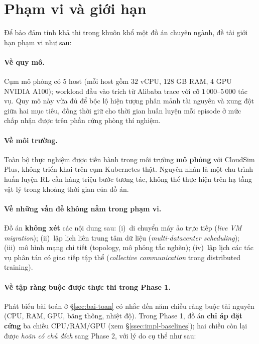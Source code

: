 \section{Phạm vi và giới hạn}
\label{sec:pham-vi}

Để bảo đảm tính khả thi trong khuôn khổ một đồ án chuyên ngành, đề tài giới
hạn phạm vi như sau:

\paragraph{Về quy mô.}
Cụm mô phỏng có $5$ host (mỗi host gồm $32$ vCPU, $128$ GB RAM, $4$ GPU
NVIDIA A100); workload đầu vào trích từ Alibaba trace với cỡ
$1\,000$--$5\,000$ tác vụ. Quy mô này vừa đủ để bộc lộ hiện tượng phân mảnh
tài nguyên và xung đột giữa hai mục tiêu, đồng thời giữ cho thời gian huấn
luyện mỗi episode ở mức chấp nhận được trên phần cứng phòng thí nghiệm.

\paragraph{Về môi trường.}
Toàn bộ thực nghiệm được tiến hành trong môi trường \textbf{mô phỏng} với
CloudSim Plus, không triển khai trên cụm Kubernetes thật. Nguyên nhân là một
chu trình huấn luyện RL cần hàng triệu bước tương tác, không thể thực hiện
trên hạ tầng vật lý trong khoảng thời gian của đồ án.

\paragraph{Về những vấn đề không nằm trong phạm vi.}
Đồ án \textbf{không xét} các nội dung sau: (i)~di chuyển máy ảo trực tiếp
(\textit{live VM migration}); (ii)~lập lịch liên trung tâm dữ liệu
(\textit{multi-datacenter scheduling}); (iii)~mô hình mạng chi tiết
(topology, mô phỏng tắc nghẽn); (iv)~lập lịch các tác vụ phân tán có giao
tiếp tập thể (\textit{collective communication} trong distributed training).

\paragraph{Về tập ràng buộc được thực thi trong Phase 1.}
Phát biểu bài toán ở §\ref{sec:bai-toan} có nhắc đến năm chiều ràng buộc
tài nguyên (CPU, RAM, GPU, băng thông, nhiệt độ). Trong Phase 1, đồ án
\textbf{chỉ áp đặt cứng} ba chiều CPU/RAM/GPU (xem
§\ref{ssec:impl-baselines}); hai chiều còn lại được \emph{hoãn có chủ
đích} sang Phase 2, với lý do cụ thể như sau:

